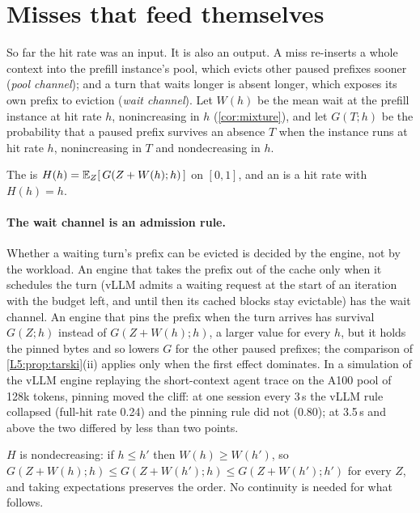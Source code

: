\section{Misses that feed themselves}\label{L5:sec:feedback}

So far the hit rate was an input. It is also an output. A miss re-inserts a whole
context into the prefill instance's pool, which evicts other paused prefixes sooner
(\emph{pool channel}); and a turn that waits longer is absent longer, which exposes its
own prefix to eviction (\emph{wait channel}). Let $W(h)$ be the mean wait at the prefill
instance at hit rate $h$, nonincreasing in $h$ (\cref{cor:mixture}), and let $G(T;h)$ be
the probability that a paused prefix survives an absence $T$ when the instance runs at
hit rate $h$, nonincreasing in $T$ and nondecreasing in $h$.

\begin{definition}\label{L5:def:feedback}
The  is $H(h)=\mathbb{E}_Z[\,G(Z+W(h);h)\,]$ on $[0,1]$, and an
 is a hit rate with $H(h)=h$.
\end{definition}

\paragraph{The wait channel is an admission rule.} Whether a waiting turn's prefix
can be evicted is decided by the engine, not by the workload. An engine that
takes the prefix out of the cache only when it schedules the turn (vLLM admits a
waiting request at the start of an iteration with the budget left, and until then
its cached blocks stay evictable) has the wait channel. An engine that pins the
prefix when the turn arrives has survival $G(Z;h)$ instead of $G(Z+W(h);h)$, a larger
value for every $h$, but it holds the pinned bytes and so lowers $G$ for the other
paused prefixes; the comparison of \cref{L5:prop:tarski}(ii) applies only when the
first effect dominates. In a simulation of the vLLM engine replaying the
short-context agent trace on the A100 pool of 128k tokens, pinning moved the cliff:
at one session every 3\,s the vLLM rule collapsed (full-hit rate 0.24) and the pinning
rule did not (0.80); at 3.5\,s and above the two differed by less than two points.

$H$ is nondecreasing: if $h\le h'$ then $W(h)\ge W(h')$, so
$G(Z+W(h);h)\le G(Z+W(h');h)\le G(Z+W(h');h')$ for every $Z$, and taking expectations
preserves the order. No continuity is needed for what follows.

